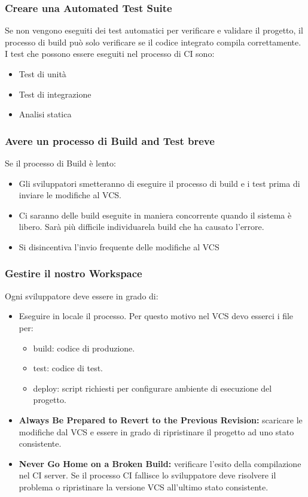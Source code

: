 \subsubsection{Creare una Automated Test Suite}
Se non vengono eseguiti dei test automatici per verificare e validare il progetto, il
processo di build può solo verificare se il codice integrato compila correttamente.
I test che possono essere eseguiti nel processo di CI sono:
\begin{itemize}
    \item Test di unità
    \item Test di integrazione
    \item Analisi statica
\end{itemize}

\subsubsection{Avere un processo di Build and Test breve}
Se il processo di Build è lento:
\begin{itemize}
    \item Gli sviluppatori smetteranno di eseguire il processo di build e i test prima di inviare le modifiche al VCS.
    \item Ci saranno delle build eseguite in maniera concorrente quando il sistema è libero. Sarà più difficile individuarela build che ha causato l’errore.
    \item Si disincentiva l’invio frequente delle modifiche al VCS
\end{itemize}

\subsubsection{Gestire il nostro Workspace}
Ogni sviluppatore deve essere in grado di:
\begin{itemize}
    \item Eseguire in locale il processo. Per questo motivo nel VCS devo esserci i file per:
    \begin{itemize}
        \item build: codice di produzione.
        \item test: codice di test.
        \item deploy: script richiesti per configurare ambiente di esecuzione del progetto.
    \end{itemize}
    \item \textbf{Always Be Prepared to Revert to the Previous Revision:} scaricare le modifiche dal VCS e essere in grado di ripristinare il progetto ad uno stato consistente.
    \item \textbf{Never Go Home on a Broken Build:} verificare l’esito della compilazione nel CI server. Se il processo CI fallisce lo sviluppatore deve risolvere il problema o ripristinare la versione VCS all’ultimo stato consistente.
\end{itemize}

